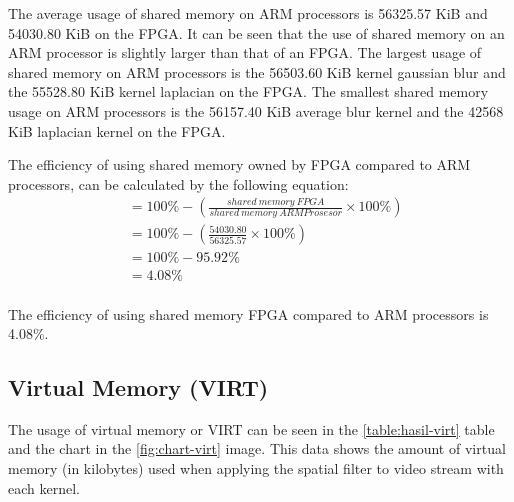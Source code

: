 The average usage of shared memory on ARM processors is 56325.57 KiB and 54030.80 KiB on the FPGA. It can be seen that the use of shared memory on an ARM processor is slightly larger than that of an FPGA. The largest usage of shared memory on ARM processors is the 56503.60 KiB kernel gaussian blur and the 55528.80 KiB kernel laplacian on the FPGA. The smallest shared memory usage on ARM processors is the 56157.40 KiB average blur kernel and the 42568 KiB laplacian kernel on the FPGA.


The efficiency of using shared memory owned by FPGA compared to ARM processors, can be calculated by the following equation:
\begin{equation*}
    \begin{split}
& = 100\% - \left( \frac{shared\ memory\ FPGA}{shared\ memory\ ARM Prosesor} \times 100\% \right) \\
& = 100\% - \left( \frac{54030.80}{56325.57} \times 100\% \right) \\
& = 100\% - 95.92\% \\
& = 4.08\% \\
    \end{split}
\end{equation*}

The efficiency of using shared memory FPGA compared to ARM processors is 4.08\%.


\subsection{Virtual Memory (VIRT)}


The usage of virtual memory or VIRT can be seen in the \ref{table:hasil-virt} table and the chart in the \ref{fig:chart-virt} image. This data shows the amount of virtual memory (in kilobytes) used when applying the spatial filter to video stream with each kernel.

